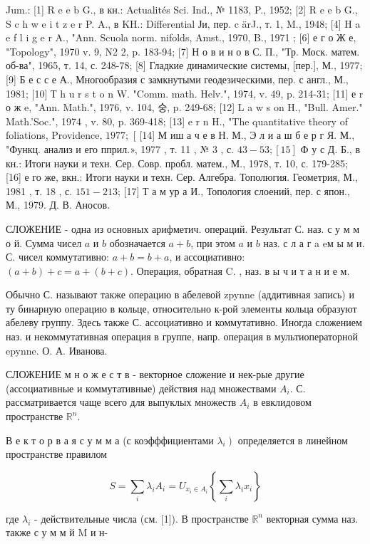 \documentclass[10pt]{article}
\begin{document}
Jum.: [1] R e e b G., в кн.: Actualités Sci. Ind., № 1183, P., 1952; [2] R e e b G., S c h w e i t z e r P. A., в KH.: Differential Ји, пер. c ärJ., т. 1, M., 1948; [4] H a e f l i g e r A., "Ann. Scuola norm. nifolds, Amst., 1970, B., 1971 ; [6] е г о Ж е, "Topology", 1970 v. 9, N2 2, p. 183-94; [7] Н о в и н о в С. П., "Тр. Моск. матем. об-ва", 1965, т. 14, с. 248-78; [8] Гладкие динамические системы, [пер.], М., 1977; [9] Б е с с е А., Многообразия с замкнутыми геодезическими, пер. с англ., М., 1981; [10] Т h u r s t o n W. "Comm. math. Helv.", 1974, v. 49, p. 214-31; [11] е r о ж e, "Ann. Math.", 1976, v. 104, 숭, p. 249-68; [12] L a w s on H., "Bull. Amer." Math.'Soc.", 1974 , v. 80, p. 369-418; [13] e r n H., "The quantitative theory of foliations, Providence, $1977 ;$ [ [14] М иш а ч е в Н. М., Э л и а ш б е р г Я. М., "Функц. анализ и его пприл.», 1977 , т. 11 , № 3 , с. $43-53 ;[15]$ Ф у с Д. Б., в кн.: Итоги науки и техн. Сер. Совр. пробл. матем., М., 1978, т. 10, с. 179-285; [16] е го же, вкн.: Итоги науки и техн. Сер. Алгебра. Тополюгия. Геометрия, М., 1981 , т. 18 , с. $151-213$; [17] Т а м ур а И., Топология слоений, пер. с япон., М., 1979. Д. В. Аносов.



СЛОЖЕНИЕ - одна из основных арифметич. операций. Результат С. наз. с у м м о й. Сумма чисел $a$ и $b$ обозначается $a+b$, при этом $a$ и $b$ наз. с л а г a eм ы м и. С. чисел коммутативно: $a+b=b+a$, и ассоциативно: $(a+b)+c=a+(b+c)$. Операция, обратная $\mathrm{C}$. , наз. в ы ч и т а н и е м.



Обычно С. называют также операцию в абелевой zpynne (аддитивная запись) и ту бинарную операцию в кольце, относительно к-рой элементы кольца образуют абелеву группу. Здесь также С. ассоциативно и коммутативно. Иногда сложением наз. и некоммутативная операция в группе, напр. операция в мультиоператорной epynne. О. А. Иванова.



СЛОЖЕНИЕ м н о ж е с т в - векторное сложение и нек-рые другие (ассоциативные и коммутативные) действия над множествами $A_{i}$. С. рассматривается чаще всего для выпуклых множеств $A_{i}$ в евклидовом пространстве $\mathbb{R}^{n}$.



В е к т о р в а я с у м м а (с коэфффициентами $\left.\lambda_{i}\right)$ определяется в линейном пространстве правилом



\[

S=\sum_{i} \lambda_{i} A_{i}=U_{x_{i} \in A_{i}}\left\{\sum_{i} \lambda_{i} x_{i}\right\}

\]



где $\lambda_{i}$ - действительные числа (см. [1]). В пространстве $\mathbb{R}^{n}$ векторная сумма наз. также с у м м й $\mathrm{M}$ и н-
\end{document}
